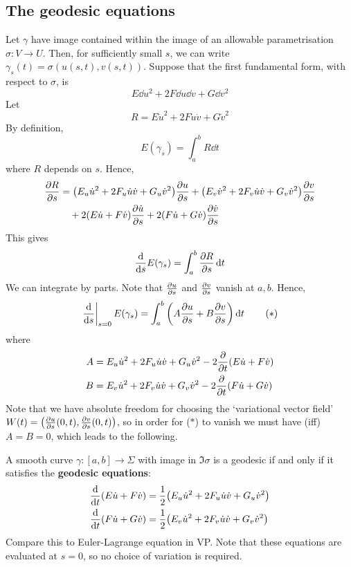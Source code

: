 \documentclass[a4paper]{article}
\begin{document}
\subsection{The geodesic equations}
Let \( \gamma \) have image contained within the image of an allowable parametrisation \( \sigma \colon V \to U \).
Then, for sufficiently small \( s \), we can write \( \gamma_s(t) = \sigma(u(s,t), v(s,t)) \).
Suppose that the first fundamental form, with respect to \( \sigma \), is
\[
	E \dd{u}^2 + 2F \dd{u} \dd{v} + G \dd{v}^2
\]
Let
\[
	R = E \dot u^2 + 2F \dot u \dot v + G \dot v^2
\]
By definition,
\[
	E(\gamma_s) = \int_a^b R \dd{t}
\]
where \( R \) depends on \( s \).
Hence,
\begin{align*}
	\pdv{R}{s} & = \qty(E_u \dot u^2 + 2F_u \dot u \dot v + G_u \dot v^2) \pdv{u}{s} + \qty(E_v \dot v^2 + 2F_v \dot u \dot v + G_v \dot v^2) \pdv{v}{s} \\
	           & \quad + 2 (E \dot u + F \dot v) \pdv{\dot u}{s} + 2(F \dot u + G \dot v) \pdv{\dot v}{s}
\end{align*}
This gives
\[
	\dv{s} E(\gamma_s) = \int_a^b \pdv{R}{s} \dd{t}
\]
We can integrate by parts.
Note that \( \pdv{u}{s} \) and \( \pdv{v}{s} \) vanish at \( a,b \).
Hence,
\[
	\eval{\dv{s}}_{s=0} E(\gamma_s) = \int_a^b \qty(A \pdv{u}{s} + B \pdv{v}{s}) \dd{t} \tag{$*$}
\]
where
\begin{align*}
	A & = E_u \dot u^2 + 2F_u \dot u \dot v + G_u \dot v^2 - 2 \pdv{t} \qty(E \dot u + F \dot v) \\
	B & = E_v \dot u^2 + 2F_v \dot u \dot v + G_v \dot v^2 - 2 \pdv{t} \qty(F \dot u + G \dot v)
\end{align*}
Note that we have absolute freedom for choosing the `variational vector field' $ W(t) = \qty( \pdv{u}{s} \qty(0,t), \pdv{v}{s} \qty(0,t) ) $, so in order for ($*$) to vanish we must have (iff) $A=B=0$, which leads to the following.
\begin{corollary}
	A smooth curve \( \gamma \colon [a,b] \to \Sigma \) with image in \( \Im \sigma \) is a geodesic if and only if it satisfies the \textbf{geodesic equations}:
	\begin{align*}
		\dv{t} \qty(E \dot u + F \dot v) & = \frac{1}{2} \qty( E_u \dot u^2 + 2F_u \dot u \dot v + G_u \dot v^2 ) \\
		\dv{t} \qty(F \dot u + G \dot v) & = \frac{1}{2} \qty( E_v \dot u^2 + 2F_v \dot u \dot v + G_v \dot v^2 )
	\end{align*}
	Compare this to Euler-Lagrange equation in VP. 
	Note that these equations are evaluated at \( s = 0 \), so no choice of variation is required.
\end{corollary}
\end{document}
